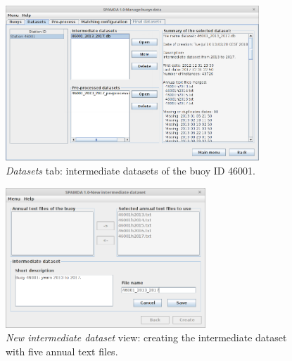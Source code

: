 \documentclass[energies,article,accept,moreauthors,pdftex]{Definitions/mdpi}
\begin{document}
\nointerlineskip
\begin{figure}[H]
				\widefigure
				\includegraphics[width=0.85\textwidth]{figures/FigureDatasets.png}
				\caption{\textit{Datasets} tab: intermediate datasets of the buoy ID 46001.}\label{fig:show_datasets}
			\end{figure}
\begin{paracol}{2}
\switchcolumn	
\vspace{-6pt}
		
			\begin{figure}[H]
				\includegraphics[width=0.67\textwidth]{figures/FigureNew_intermediate_dataset.png}
				\caption{\textit{New intermediate dataset} view: creating the intermediate dataset with five annual text files.}\label{fig:intermediate}
			\end{figure}
\vspace{-6pt}

		\newpage	
\end{paracol}
\nointerlineskip
\end{document}
